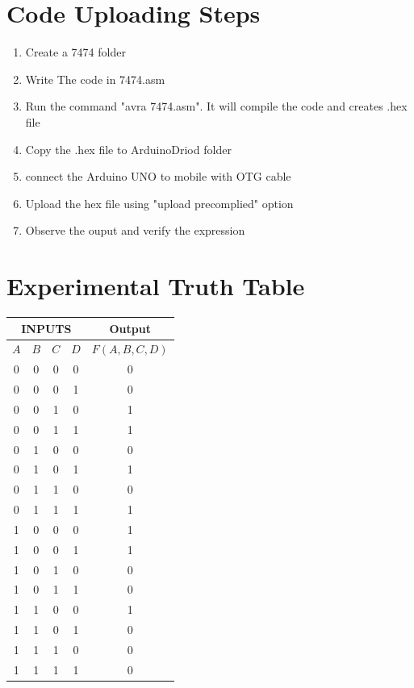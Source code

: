 \documentclass[a4paper,12pt]{article}
\begin{document}
\section*{Code Uploading Steps}
\begin{enumerate}
        \item Create a 7474 folder
        \item Write The code in 7474.asm
        \item Run the command "avra 7474.asm". It will compile the code and creates .hex file
        \item Copy the .hex file to ArduinoDriod folder
        \item connect the Arduino UNO to mobile with OTG cable
        \item Upload the hex file using "upload precomplied" option
        \item Observe the ouput and verify the expression
\end{enumerate}
\section*{Experimental Truth Table}
\begin{center}
\begin{tabular}{|c|c|c|c|c|}
\hline
\multicolumn{4}{|c|}{\textbf{INPUTS}} & \textbf{Output} \\
\hline
$A$ & $B$ & $C$ & $D$ & $F(A,B,C,D)$ \\
\hline
0 & 0 & 0 & 0 & 0 \\ 
0 & 0 & 0 & 1 & 0 \\ 
0 & 0 & 1 & 0 & 1 \\ 
0 & 0 & 1 & 1 & 1 \\ 
0 & 1 & 0 & 0 & 0 \\ 
0 & 1 & 0 & 1 & 1 \\ 
0 & 1 & 1 & 0 & 0 \\ 
0 & 1 & 1 & 1 & 1 \\ 
1 & 0 & 0 & 0 & 1 \\ 
1 & 0 & 0 & 1 & 1 \\ 
1 & 0 & 1 & 0 & 0 \\ 
1 & 0 & 1 & 1 & 0 \\ 
1 & 1 & 0 & 0 & 1 \\ 
1 & 1 & 0 & 1 & 0 \\ 
1 & 1 & 1 & 0 & 0 \\ 
1 & 1 & 1 & 1 & 0 \\ 
\hline
\end{tabular}
\end{center}
\end{document}
